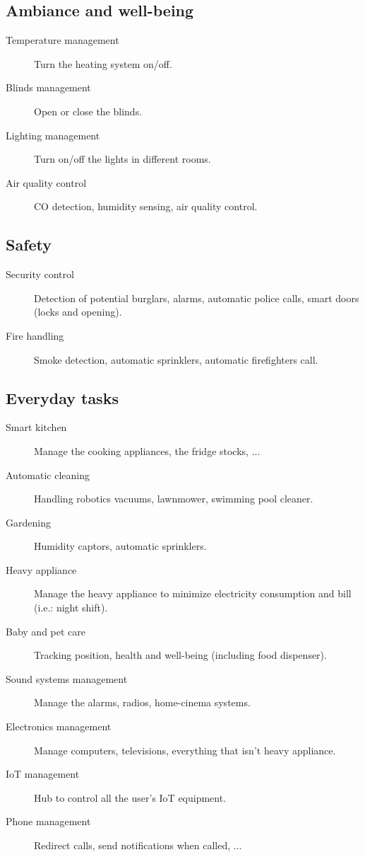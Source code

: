         \subsection{Ambiance and well-being}
            \begin{description}
                \item[Temperature management] Turn the heating system on/off.
                \item[Blinds management] Open or close the blinds.
                \item[Lighting management] Turn on/off the lights in different rooms.
                \item[Air quality control] CO detection, humidity sensing, air quality control.
            \end{description}

        \subsection{Safety}
            \begin{description}
                \item[Security control] Detection of potential burglars, alarms, automatic police calls, smart doors (locks and opening).
                \item[Fire handling] Smoke detection, automatic sprinklers, automatic firefighters call.
            \end{description}

        \subsection{Everyday tasks}
            \begin{description}
                \item[Smart kitchen] Manage the cooking appliances, the fridge stocks, ...
                \item[Automatic cleaning] Handling robotics vacuums, lawnmower, swimming pool cleaner.
                \item[Gardening] Humidity captors, automatic sprinklers.
                \item[Heavy appliance] Manage the heavy appliance to minimize electricity consumption and bill (i.e.: night shift).
                \item[Baby and pet care] Tracking position, health and well-being (including food dispenser).
                \item[Sound systems management] Manage the alarms, radios, home-cinema systems.
                \item[Electronics management] Manage computers, televisions, everything that isn't heavy appliance.
                \item[IoT management] Hub to control all the user's IoT equipment.
                \item[Phone management] Redirect calls, send notifications when called, ...
            \end{description}

